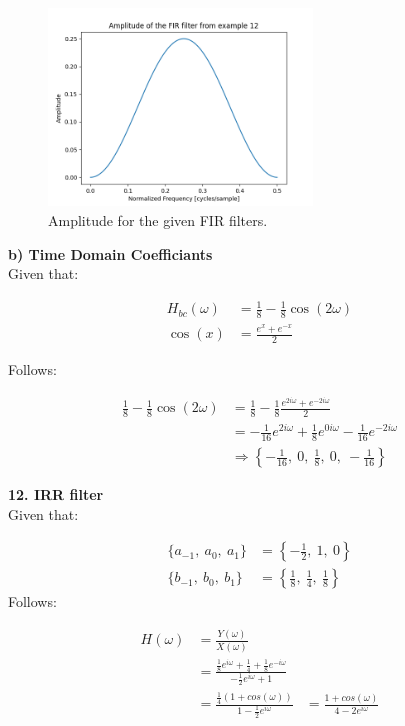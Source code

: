 \begin{figure}[h]
	\centering
	\includegraphics[width=7cm]{img/ex_12.png}
	\captionsetup{width=5cm}
	\caption{Amplitude for the given FIR filters.}
\end{figure}

\newpage

\textbf{b) Time Domain Coefficiants} \\

Given that:

\begin{align}
	H_{bc}(\omega) &= \frac{1}{8} - \frac{1}{8} \cos(2\omega) \\
	\cos(x) &= \frac{e^x + e^{-x}}{2}
\end{align}

Follows:

\begin{align*}
	\frac{1}{8} - \frac{1}{8} \cos(2\omega) &= \frac{1}{8} - \frac{1}{8} \frac{e^{2i\omega} + e^{-2i\omega}}{2} \\ 
	&= -\frac{1}{16} e^{2i\omega} + \frac{1}{8} e^{0i\omega} - \frac{1}{16} e^{-2i\omega} \\
	&\Rightarrow \left\{ -\frac{1}{16},\ 0,\ \frac{1}{8},\ 0,\ -\frac{1}{16} \right\}
\end{align*}

\textbf{\large 12. IRR filter}
\\

Given that:

\begin{align}
	\{a_{-1},\ a_0,\ a_1\} &= \left\{-\frac{1}{2},\ 1,\ 0\right\} \\
	\{b_{-1},\ b_0,\ b_1\} &= \left\{\frac{1}{8},\ \frac{1}{4},\ \frac{1}{8}\right\}
\end{align}
Follows:

\begin{align*}
	H(\omega) &= \frac{Y(\omega)}{X(\omega)}\\
	&= \frac{\frac{1}{8} e^{i\omega} + \frac{1}{4} + \frac{1}{8} e^{-i\omega}}{-\frac{1}{2} e^{i\omega} + 1}\\
	&= \frac{\frac{1}{4} (1 + cos(\omega))}{1 - \frac{1}{2} e^{i\omega}}
	&= \frac{1 + cos(\omega)}{4 - 2 e^{i\omega}}
\end{align*}

